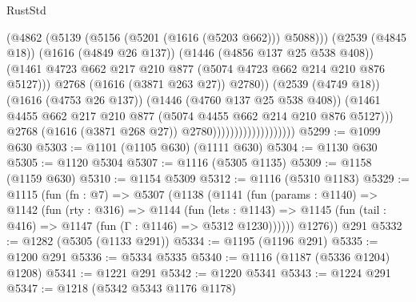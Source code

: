 \begin{lexlean}{RustStd}
\begin{coremodule}
{\begin{coremodule}
{{{{{{{{{{{                                                  (@4862
                                                    (@5139
                                                      (@5156 (@5201 (@1616 (@5203 @662))) @5088)))
                                                  (@2539 (@4845 @18))
                                                  (@1616 (@4849 @26 @137))
                                                  (@1446 (@4856 @137 @25 @538 @408))
                                                  (@1461
                                                    @4723
                                                    @662
                                                    @217
                                                    @210
                                                    @877
                                                    (@5074 @4723 @662 @214 @210 @876 @5127)))
                                                @2768
                                                (@1616 (@3871 @263 @27))
                                                @2780))
                                            (@2539 (@4749 @18))
                                            (@1616 (@4753 @26 @137))
                                            (@1446 (@4760 @137 @25 @538 @408))
                                            (@1461
                                              @4455
                                              @662
                                              @217
                                              @210
                                              @877
                                              (@5074 @4455 @662 @214 @210 @876 @5127)))
                                          @2768
                                          (@1616 (@3871 @268 @27))
                                          @2780)))))))))))))))))))
@5299 := @1099 @630
@5303 := @1101 (@1105 @630) (@1111 @630)
@5304 := @1130 @630
@5305 := @1120 @5304
@5307 := @1116 (@5305 @1135)
@5309 := @1158 (@1159 @630)
@5310 := @1154 @5309
@5312 := @1116 (@5310 @1183)
@5329 := @1115
    (fun (fn : @7) =>
    @5307
      (@1138
        (@1141
          (fun (params : @1140) =>
          @1142
            (fun (rty : @316) =>
            @1144
              (fun (lets : @1143) =>
              @1145 (fun (tail : @416) => @1147 (fun (Γ : @1146) => @5312 @1230))))))
        @1276))
    @291
@5332 := @1282 (@5305 (@1133 @291))
@5334 := @1195 (@1196 @291)
@5335 := @1200 @291
@5336 := @5334 @5335
@5340 := @1116 (@1187 (@5336 @1204) @1208)
@5341 := @1221 @291
@5342 := @1220 @5341
@5343 := @1224 @291
@5347 := @1218 (@5342 @5343 @1176 @1178)
}}}}}}}}}}}
\end{coremodule}}
\end{coremodule}
\end{lexlean}
